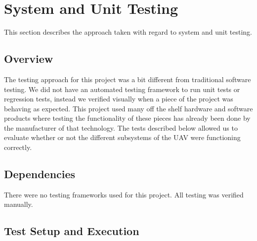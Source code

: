 
\chapter{System  and Unit Testing}

This section describes the approach taken with regard to system and unit testing. 

\section{Overview}
The testing approach for this project was a bit different from traditional software testing. We did not have an automated testing framework to run unit tests or regression tests, instead we verified visually when a piece of the project was behaving as expected. This project used many off the shelf hardware and software products where testing the functionality of these pieces has already been done by the manufacturer of that technology. The tests described below allowed us to evaluate whether or not the different subsystems of the UAV were functioning correctly.

\section{Dependencies}
There were no testing frameworks used for this project. All testing was verified manually.
\

\section{Test Setup and Execution}
